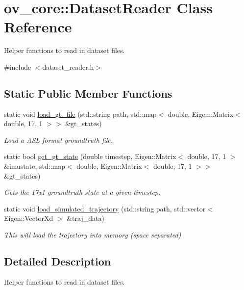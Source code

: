 \hypertarget{classov__core_1_1DatasetReader}{}\section{ov\+\_\+core\+:\+:Dataset\+Reader Class Reference}
\label{classov__core_1_1DatasetReader}


Helper functions to read in dataset files.  




{\ttfamily \#include $<$dataset\+\_\+reader.\+h$>$}

\subsection*{Static Public Member Functions}
\begin{DoxyCompactItemize}
\item 
static void \hyperlink{classov__core_1_1DatasetReader_a948c021c3e3d80afe6a7248fd8423104}{load\+\_\+gt\+\_\+file} (std\+::string path, std\+::map$<$ double, Eigen\+::\+Matrix$<$ double, 17, 1 $>$$>$ \&gt\+\_\+states)
\begin{DoxyCompactList}\small\item\em Load a A\+SL format groundtruth file. \end{DoxyCompactList}\item 
static bool \hyperlink{classov__core_1_1DatasetReader_af7827150c03a1871d5211764699ef0eb}{get\+\_\+gt\+\_\+state} (double timestep, Eigen\+::\+Matrix$<$ double, 17, 1 $>$ \&imustate, std\+::map$<$ double, Eigen\+::\+Matrix$<$ double, 17, 1 $>$$>$ \&gt\+\_\+states)
\begin{DoxyCompactList}\small\item\em Gets the 17x1 groundtruth state at a given timestep. \end{DoxyCompactList}\item 
static void \hyperlink{classov__core_1_1DatasetReader_accb2a66a6468edf517c254aaa2e691d4}{load\+\_\+simulated\+\_\+trajectory} (std\+::string path, std\+::vector$<$ Eigen\+::\+Vector\+Xd $>$ \&traj\+\_\+data)
\begin{DoxyCompactList}\small\item\em This will load the trajectory into memory (space separated) \end{DoxyCompactList}\end{DoxyCompactItemize}


\subsection{Detailed Description}
Helper functions to read in dataset files. 

